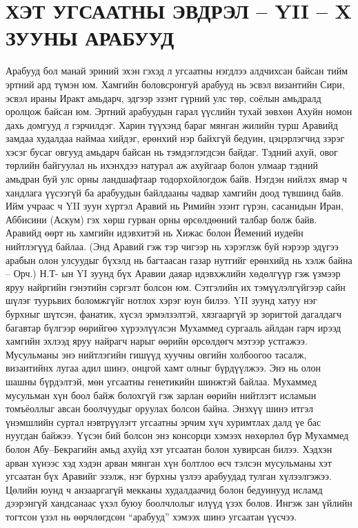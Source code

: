 \section{ХЭТ УГСААТНЫ ЭВДРЭЛ – YII – X ЗУУНЫ АРАБУУД}
Арабууд бол манай эриний эхэн гэхэд л угсаатны нэгдлээ алдчихсан байсан тийм эртний ард түмэн юм. Хамгийн боловсронгуй арабууд нь эсвэл византийн Сири, эсвэл ираны Иракт амьдарч, эдгээр эзэнт гүрний улс төр, соёлын амьдралд оролцож байсан юм.
Эртний арабуудын гарал үүслийн тухай зөвхөн Ахуйн номон дахь домгууд л гэрчилдэг. Харин түүхэнд бараг мянган жилийн турш Аравийд замдаа худалдаа наймаа хийдэг, ерөнхий нэр байхгүй бедуин, цэцэрлэгчид зэрэг хэсэг бусаг овгууд амьдарч байсан нь тэмдэглэгдсэн байдаг. Тэдний ахуй, овог төрлийн байгуулал нь ихэнхдээ натурал аж ахуйгаар болон улмаар тэдний амьдран буй улс орны ландшафтаар тодорхойлогдож байв. Нэгдэн нийлэх ямар ч хандлага үүсээгүй ба арабуудын байлдааны чадвар хамгийн доод түвшинд байв. Ийм учраас ч YII зуун хүртэл Аравий нь Римийн эзэнт гүрэн, сасанидын Иран, Аббисини (Аскум) гэх хөрш гурван орны өрсөлдөөний талбар болж байв. Аравийд өөрт нь хамгийн идэвхитэй нь Хижас болон Йемений иудейн нийтлэгүүд байлаа.
(Энд Аравий гэж тэр чигээр нь хэрэглэж буй нэрээр эдүгээ арабын олон улсуудыг бүхэлд нь багтаасан газар нутгийг ерөнхийд нь хэлж байна – Орч.)
Н.Т- ын YI зуунд бүх Аравии даяар идэвхжлийн хөдөлгүүр гэж үзмээр яруу найргийн гэнэтийн сэргэлт болсон юм. Сэтгэлийн их тэмүүлэлгүйгээр сайн шүлэг туурьвих боломжгүйг нотлох хэрэг юун билээ. YII зуунд хатуу нэг бурхныг шүтсэн, фанатик, хүсэл эрмэлзэлтэй, хязгааргүй эр зоригтой дагалдагч багавтар бүлгээр өөрийгөө хүрээлүүлсэн Мухаммед сургааль айлдан гарч ирээд хамгийн эхлээд яруу найрагч нарыг өөрийн өрсөлдөгч мэтээр устгажээ. Мусульманы энэ нийтлэгийн гишүүд хуучны овгийн холбоогоо тасалж, византийнх лугаа адил шинэ, онцгой хамт олныг бүрдүүлжээ. Энэ нь олон шашны бүрдэлтэй, мөн угсаатны генетикийн шинжтэй байлаа. Мухаммед мусульман хүн боол байж болохгүй гэж зарлан өөрийн нийтлэгт исламын томъёоллыг авсан боолчуудыг оруулах болсон байна. Энэхүү шинэ итгэл үнэмшлийн суртал нэвтрүүлэгт угсаатны эрчим хүч хуримтлах далд үе бас нуугдан байжээ.
Үүсэн бий болсон энэ консорци хэмээх нөхөрлөл бүр Мухаммед болон Абу–Бекрагийн амьд ахуйд хэт угсаатан болон хувирсан билээ. Хэдхэн арван хүнээс хэд хэдэн арван мянган хүн болтлоо өсч тэлсэн мусульманы хэт угсаатан бүх Аравийг эзэлж, нэг бурхны үзлээ арабуудад тулган хүлээлгэжээ. Цөлийн юунд ч анзааргагүй мекканы худалдаачид болон бедуинууд исламд дээрэнгүй хандсанаас үхэл буюу боолчлолыг илүүд үзэх болов. Ингэж зан үйлийн тогтсон үзэл нь өөрчлөгдсөн “арабууд” хэмээх шинэ угсаатан үүсчээ.
